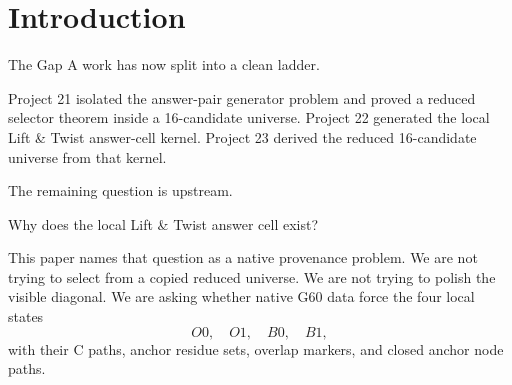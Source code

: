 \section{Introduction}

The Gap A work has now split into a clean ladder.

Project 21 isolated the answer-pair generator problem and proved a reduced selector theorem inside a 16-candidate universe.  Project 22 generated the local Lift \& Twist answer-cell kernel.  Project 23 derived the reduced 16-candidate universe from that kernel.

The remaining question is upstream.

Why does the local Lift \& Twist answer cell exist?

This paper names that question as a native provenance problem.  We are not trying to select from a copied reduced universe.  We are not trying to polish the visible diagonal.  We are asking whether native G60 data force the four local states
\[
    O0,\quad O1,\quad B0,\quad B1,
\]
with their C paths, anchor residue sets, overlap markers, and closed anchor node paths.
